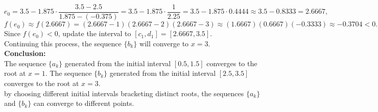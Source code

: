 \documentclass{article}
\begin{document}
\[
    e_0 = 3.5 - 1.875 \cdot \frac{3.5 - 2.5}{1.875 - (-0.375)} = 3.5 - 1.875 \cdot \frac{1}{2.25} = 3.5 - 1.875 \cdot 0.4444 \approx 3.5 - 0.8333 = 2.6667,
\]
\[
    f(e_0) \approx f(2.6667) = (2.6667 - 1)(2.6667 - 2)(2.6667 - 3) \approx (1.6667)(0.6667)(-0.3333) \approx -0.3704 < 0.
\]
Since \( f(e_0) < 0 \), update the interval to \( [c_1, d_1] = [2.6667, 3.5] \).
\\
Continuing this process, the sequence \( \{ b_k \} \) will converge to \( x = 3 \).
\\
\textbf{Conclusion:}
\\
The sequence \( \{ a_k \} \) generated from the initial interval \( [0.5, 1.5] \) converges to the root at \( x = 1 \).
The sequence \( \{ b_k \} \) generated from the initial interval \( [2.5, 3.5] \) converges to the root at \( x = 3 \).
\\
by choosing different initial intervals bracketing distinct roots, the sequences \( \{ a_k \} \) and \( \{ b_k \} \) can converge to different points.
\end{document}
